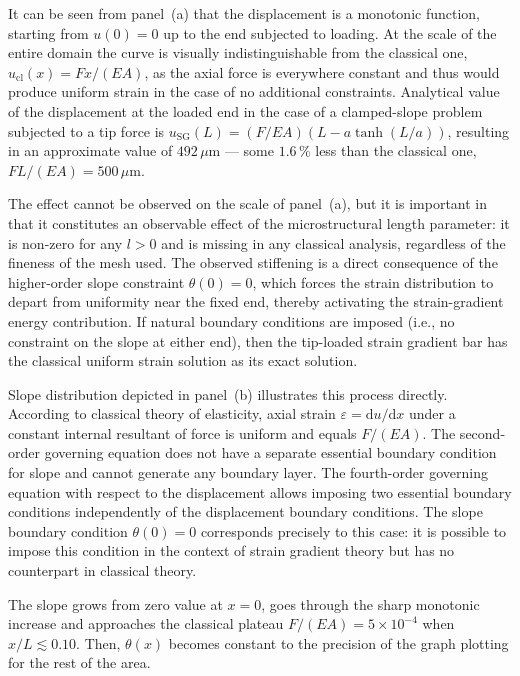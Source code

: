\documentclass[final,3p,times,fleqn]{elsarticle}
\begin{document}
It can be seen from panel~(a) that the displacement is a monotonic function,
starting from $u(0) = 0$ up to the end subjected to loading.
At the scale of the entire domain the curve is visually indistinguishable from the classical one,
$u_{\mathrm{cl}}(x) = Fx/(EA)$, as the axial force is everywhere constant and thus would produce
uniform strain in the case of no additional constraints.
Analytical value of the displacement at the loaded end in the case of a clamped-slope problem
subjected to a tip force is $u_{\mathrm{SG}}(L) = (F/EA)(L - a\tanh(L/a))$, resulting
in an approximate value of $492\,\mu\mathrm{m}$ --- some $1.6\,\%$ less than the classical
one, $FL/(EA) =  500\,\mu\mathrm{m}$.

The effect cannot be observed on the scale of panel~(a),
but it is important in that it constitutes an observable effect of the
microstructural length parameter: it is non-zero for any $l > 0$ and
is missing in any classical analysis, regardless of the fineness of the mesh used.
The observed stiffening is a direct consequence of the higher-order slope constraint $\theta(0)=0$, which forces the strain distribution to depart from uniformity near the fixed end, thereby activating the strain-gradient energy contribution. If natural boundary conditions are imposed (i.e., no constraint on
the slope at either end), then the tip-loaded strain gradient bar
has the classical uniform strain solution as its exact solution.


Slope distribution depicted in panel~(b) illustrates this process
directly.
According to classical theory of elasticity, axial strain
$\varepsilon = \mathrm{d}u/\mathrm{d}x$ under a constant internal
resultant of force is uniform and equals $F/(EA)$. The second-order
governing equation does not have a separate essential boundary
condition for slope and cannot generate any boundary layer.
The fourth-order governing equation with respect to the displacement
allows imposing two essential boundary conditions independently of
the displacement boundary conditions.
The slope boundary condition $\theta(0)=0$ corresponds precisely to
this case: it is possible to impose this condition in the context of
strain gradient theory but has no counterpart in classical theory.


The slope grows from zero value at $x=0$, goes through the sharp monotonic
increase and approaches the classical plateau $F/(EA)=5 \times 10^{-4}$
when $x/L \lesssim 0.10$. 
Then, $\theta(x)$ becomes constant to the precision of the graph
plotting for the rest of the area. 
\end{document}
